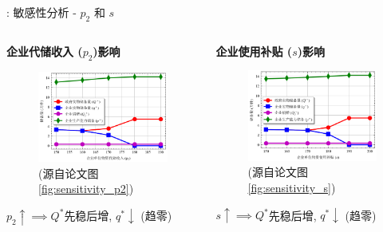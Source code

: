 \documentclass[9pt]{beamer}
\begin{document}
\begin{frame}{\insertsectionhead: 敏感性分析 - $p_2$ 和 $s$}
    \begin{columns}[T]
        \begin{column}{0.5\textwidth}
            \textbf{企业代储收入 ($p_2$)影响}
            \begin{figure}
                \includegraphics[width=\linewidth]{basic_pictures/sensitivity_p2.png}
                \caption*{(源自论文图 \ref{fig:sensitivity_p2})}
            \end{figure}
            \footnotesize $p_2 \uparrow \implies Q^*$先稳后增, $q^* \downarrow$ (趋零)
        \end{column}
        \begin{column}{0.5\textwidth}
            \textbf{企业使用补贴 ($s$)影响}
            \begin{figure}
                \includegraphics[width=\linewidth]{basic_pictures/sensitivity_s.png}
                \caption*{(源自论文图 \ref{fig:sensitivity_s})}
            \end{figure}
            \footnotesize $s \uparrow \implies Q^*$先稳后增, $q^* \downarrow$ (趋零)
        \end{column}
    \end{columns}
\end{frame}
\end{document}
